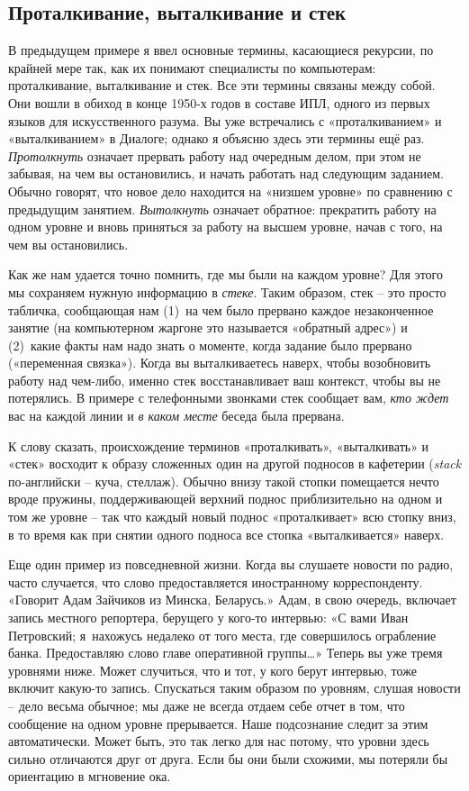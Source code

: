 \documentclass[../main.tex]{subfiles}
\begin{document}
\subsection{Проталкивание, выталкивание и стек}

В предыдущем примере я ввел основные термины, касающиеся рекурсии, по крайней мере так, как их понимают специалисты по компьютерам: проталкивание, выталкивание и стек. Все эти термины связаны между собой. Они вошли в обиход в конце 1950-х годов в составе ИПЛ, одного из первых языков для искусственного разума. Вы уже встречались с «проталкиванием» и «выталкиванием» в Диалоге; однако я объясню здесь эти термины ещё раз. \emph{Протолкнуть} означает прервать работу над очередным делом, при этом не забывая, на чем вы остановились, и начать работать над следующим заданием. Обычно говорят, что новое дело находится на «низшем уровне» по сравнению с предыдущим занятием. \emph{Вытолкнуть} означает обратное: прекратить работу на одном уровне и вновь приняться за работу на высшем уровне, начав с того, на чем вы остановились.

Как же нам удается точно помнить, где мы были на каждом уровне? Для этого мы сохраняем нужную информацию в \emph{стеке}. Таким образом, стек \--- это просто табличка, сообщающая нам (1)~на чем было прервано каждое незаконченное занятие (на компьютерном жаргоне это называется «обратный адрес») и (2)~какие факты нам надо знать о моменте, когда задание было прервано («переменная связка»). Когда вы выталкиваетесь наверх, чтобы возобновить работу над чем-либо, именно стек восстанавливает ваш контекст, чтобы вы не потерялись. В примере с телефонными звонками стек сообщает вам, \emph{кто ждет} вас на каждой линии и \emph{в каком месте} беседа была прервана.

К слову сказать, происхождение терминов «проталкивать», «выталкивать» и «стек» восходит к образу сложенных один на другой подносов в кафетерии (\emph{stack} по-английски \--- куча, стеллаж). Обычно внизу такой стопки помещается нечто вроде пружины, поддерживающей верхний поднос приблизительно на одном и том же уровне \--- так что каждый новый поднос «проталкивает» всю стопку вниз, в то время как при снятии одного подноса все стопка «выталкивается» наверх.

Еще один пример из повседневной жизни. Когда вы слушаете новости по радио, часто случается, что слово предоставляется иностранному корреспонденту. «Говорит Адам Зайчиков из Минска, Беларусь.» Адам, в свою очередь, включает запись местного репортера, берущего у кого-то интервью: «С вами Иван Петровский; я~нахожусь недалеко от того места, где совершилось ограбление банка. Предоставляю слово главе оперативной группы\ldots» Теперь вы уже тремя уровнями ниже. Может случиться, что и тот, у кого берут интервью, тоже включит какую-то запись. Спускаться таким образом по уровням, слушая новости \--- дело весьма обычное; мы даже не всегда отдаем себе отчет в том, что сообщение на одном уровне прерывается. Наше подсознание следит за этим автоматически. Может быть, это так легко для нас потому, что уровни здесь сильно отличаются друг от друга. Если бы они были схожими, мы потеряли бы ориентацию в мгновение ока.
\end{document}
